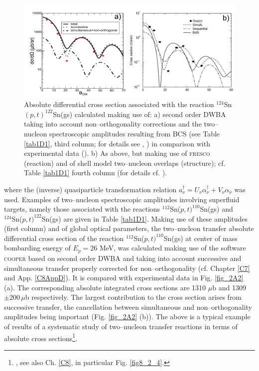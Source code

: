 \begin{figure}\label{fig2A3}
\centerline{\includegraphics*[width=\textwidth,angle=0]{nutshell/figs/fig2A3x.pdf}}
\caption{Absolute differential cross section associated with the reaction $^{124}$Sn$(p,t)^{122}$Sn(gs) calculated making use of: a) second order DWBA taking into account non--orthogonality corrections and the two--nucleon spectroscopic amplitudes resulting from BCS (see Table \ref{tab1D1}, third column; for details see \cite{Potel:13}, \cite{Potel:13b}) in comparison with experimental data (\cite{Guazzoni:11}). b) As above, but making use of \textsc{fresco} (reaction) and of shell model two--nucleon overlaps (structure); cf. Table \ref{tab1D1} fourth column (for details cf. \cite{Thompson:13}).}\label{fig_2A3}
\end{figure}
where the (inverse) quasiparticle transformation relation $a^{\dagger}_\nu=U_{\nu}\alpha^{\dagger}_{\nu}+V_{\nu}\alpha_{\bar{\nu}}$ was used. Examples of  two--nucleon spectroscopic amplitudes involving superfluid targets, namely those associated with the reactions $^{112}$Sn($p,t)^{110}$Sn(gs) and\\ $^{124}$Sn($p,t)^{122}$Sn(gs) are given in Table \ref{tab1D1}. Making use of these amplitudes (first column) and of global optical parameters, the two--nucleon transfer absolute differential cross section of the reaction $^{112}$Sn($p,t)^{110}$Sn(gs) at center of mass bombarding energy of $E_p=26$ MeV, was calculated making use of the software \textsc{cooper} based on second order DWBA and taking into account successive and simultaneous transfer properly corrected for non--orthogonality (cf. Chapter \ref{C7} and App. \ref{C8AppD}). It is compared with experimental data in Fig. \ref{fig_2A2} (a). The corresponding absolute integrated cross sections are 1310 $\mu$b and 1309$\pm 200 \,\mu$b respectively. The largest contribution to the cross section arises from successive transfer, the cancellation between simultaneous and non--orthogonality amplitudes being important (Fig. \ref{fig_2A2} (b)). The above is a typical example of results of a systematic study of two--nucleon transfer reactions in terms of absolute cross sections\footnote{\cite{Potel:13}, \cite{Potel:13b} see also Ch. \ref{C8}, in particular Fig. \ref{fig8_2_4}.}.


